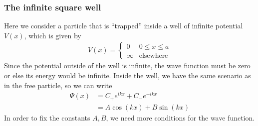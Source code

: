 \subsubsection{The infinite square well}
Here we consider a particle that is ``trapped'' inside a well of infinite potential $V(x)$, which is given by 
\begin{align*}
	V(x) = \left\{\begin{array}{ll}
		0 & 0 \leq x \leq a\\
		\infty & \text{elsewhere}
	\end{array} \right.
\end{align*}
Since the potential outside of the well is infinite, the wave function must be zero or else its energy would be infinite.
Inside the well, we have the same scenario as in the free particle, so we can write
\begin{align*}
	\Psi(x) &= C_+ e^{ikx} + C_- e^{-ikx}\\
					&= A \cos(kx) + B \sin(kx)
\end{align*}
In order to fix the constants $A,B$, we need more conditions for the wave function. 

